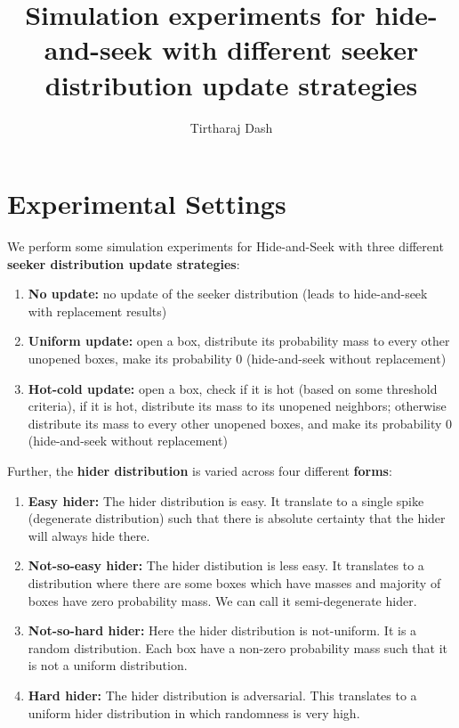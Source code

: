 \documentclass[11pt,a4paper,draft]{article}
\title{Simulation experiments for hide-and-seek with different seeker distribution update strategies}
\author{Tirtharaj Dash}
\begin{document}
\maketitle

\section{Experimental Settings}

\noindent
We perform some simulation experiments for Hide-and-Seek with three different \textbf{seeker distribution update strategies}:
\begin{enumerate}[(1)]
	\item \textbf{No update:} no update of the seeker distribution (leads to hide-and-seek with replacement results)
	\item \textbf{Uniform update:} open a box, distribute its probability mass to every other unopened boxes, make its probability 0 (hide-and-seek without replacement)
	\item \textbf{Hot-cold update:} open a box, check if it is hot (based on some threshold criteria), if it is hot, distribute its mass to its unopened neighbors; otherwise distribute its mass to every other unopened boxes, and make its probability 0 (hide-and-seek without replacement) 
\end{enumerate}

\noindent
Further, the \textbf{hider distribution} is varied across four different \textbf{forms}:
\begin{enumerate}[(1)]
	\item \textbf{Easy hider:} The hider distribution is easy. It translate to a single spike (degenerate distribution) such that there is absolute certainty that the hider will always hide there.
	\item \textbf{Not-so-easy hider:} The hider distibution is less easy. It translates to a distribution where there are some boxes which have masses and majority of boxes have zero probability mass. We can call it semi-degenerate hider.
	\item \textbf{Not-so-hard hider:} Here the hider distribution is not-uniform. It is a random distribution. Each box have a non-zero probability mass such that it is not a uniform distribution.
	\item \textbf{Hard hider:} The hider distribution is adversarial. This translates to a uniform hider distribution in which randomness is very high.
\end{enumerate}
\end{document}
